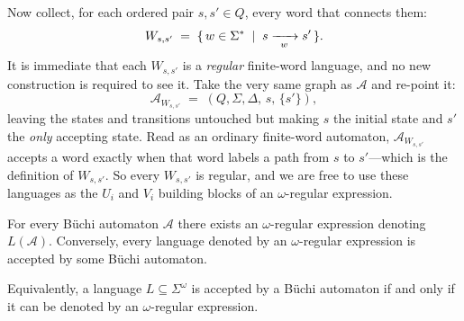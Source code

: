 \begin{center}
\end{center}

Now collect, for each ordered pair $s,s'\in Q$, every word that connects
them:
\[
  W_{s,s'} \;=\; \{\, w\in\Sigma^* \;\mid\; s \xrightarrow[{\;\;w\;\;}]{} s' \,\}.
\]
It is immediate that each $W_{s,s'}$ is a \emph{regular} finite-word
language, and no new construction is required to see it.  Take the very
same graph as $\mathcal{A}$ and re-point it:
\[
  \mathcal{A}_{W_{s,s'}} \;=\; (Q,\Sigma,\Delta,\,s,\,\{s'\}),
\]
leaving the states and transitions untouched but making $s$ the initial
state and $s'$ the \emph{only} accepting state.  Read as an ordinary
finite-word automaton, $\mathcal{A}_{W_{s,s'}}$ accepts a word exactly
when that word labels a path from $s$ to $s'$---which is the definition of
$W_{s,s'}$.  So every $W_{s,s'}$ is regular, and we are free to use these
languages as the $U_i$ and $V_i$ building blocks of an $\omega$-regular
expression.


\begin{theorem}
\label{thm:buchi-expression-equivalence}
For every B\"uchi automaton $\mathcal{A}$ there exists an
$\omega$-regular expression denoting $L(\mathcal{A})$.  Conversely,
every language denoted by an $\omega$-regular expression is accepted by
some B\"uchi automaton.

Equivalently, a language $L\subseteq\Sigma^\omega$ is accepted by a
B\"uchi automaton if and only if it can be denoted by an
$\omega$-regular expression.
\end{theorem}

